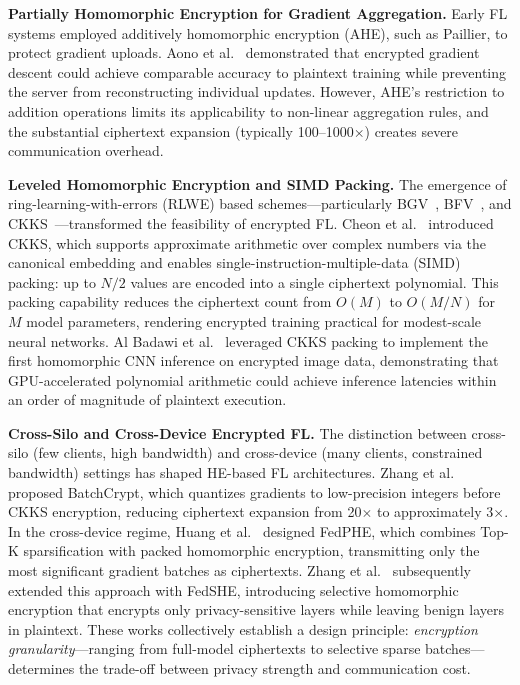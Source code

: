\textbf{Partially Homomorphic Encryption for Gradient Aggregation.} Early FL systems employed additively homomorphic encryption (AHE), such as Paillier, to protect gradient uploads. Aono et al.~\cite{aono2017privacy} demonstrated that encrypted gradient descent could achieve comparable accuracy to plaintext training while preventing the server from reconstructing individual updates. However, AHE's restriction to addition operations limits its applicability to non-linear aggregation rules, and the substantial ciphertext expansion (typically 100--1000$\times$) creates severe communication overhead.

\textbf{Leveled Homomorphic Encryption and SIMD Packing.} The emergence of ring-learning-with-errors (RLWE) based schemes---particularly BGV~\cite{brakerski2014leveled}, BFV~\cite{fan2012somewhat}, and CKKS~\cite{cheon2017homomorphic}---transformed the feasibility of encrypted FL. Cheon et al.~\cite{cheon2017homomorphic} introduced CKKS, which supports approximate arithmetic over complex numbers via the canonical embedding and enables single-instruction-multiple-data (SIMD) packing: up to $N/2$ values are encoded into a single ciphertext polynomial. This packing capability reduces the ciphertext count from $O(M)$ to $O(M/N)$ for $M$ model parameters, rendering encrypted training practical for modest-scale neural networks. Al Badawi et al.~\cite{albadawi2020alexnet} leveraged CKKS packing to implement the first homomorphic CNN inference on encrypted image data, demonstrating that GPU-accelerated polynomial arithmetic could achieve inference latencies within an order of magnitude of plaintext execution.

\textbf{Cross-Silo and Cross-Device Encrypted FL.} The distinction between cross-silo (few clients, high bandwidth) and cross-device (many clients, constrained bandwidth) settings has shaped HE-based FL architectures. Zhang et al.~\cite{zhang2020batchcrypt} proposed BatchCrypt, which quantizes gradients to low-precision integers before CKKS encryption, reducing ciphertext expansion from 20$\times$ to approximately 3$\times$. In the cross-device regime, Huang et al.~\cite{huang2023fedphe} designed FedPHE, which combines Top-K sparsification with packed homomorphic encryption, transmitting only the most significant gradient batches as ciphertexts. Zhang et al.~\cite{zhang2024fedshe} subsequently extended this approach with FedSHE, introducing selective homomorphic encryption that encrypts only privacy-sensitive layers while leaving benign layers in plaintext. These works collectively establish a design principle: \textit{encryption granularity}---ranging from full-model ciphertexts to selective sparse batches---determines the trade-off between privacy strength and communication cost.

